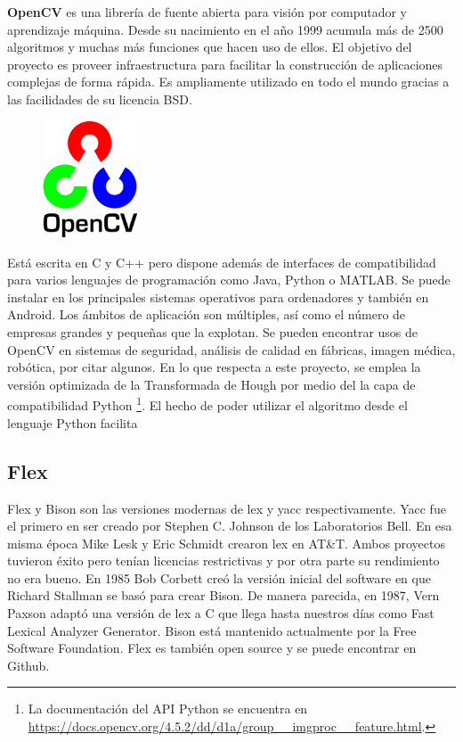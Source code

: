 \textbf{OpenCV} \cite{opencvTeam_oficialSite_main} es una librería de fuente abierta para visión por computador y aprendizaje máquina. Desde su nacimiento en el año 1999 acumula más de 2500 algoritmos y muchas más funciones que hacen uso de ellos. El objetivo del proyecto es proveer infraestructura para facilitar la construcción de aplicaciones complejas de forma rápida. Es ampliamente utilizado en todo el mundo gracias a las facilidades de su licencia BSD. 

\begin{figure}
    \centering
    \includegraphics[width=0.25\textwidth]{imaxes/e-fundamentos-tecnologicos/logo-opencv.png}
\end{figure}

Está escrita en C y C++ pero dispone además de interfaces de compatibilidad para varios lenguajes de programación como Java, Python o MATLAB. Se puede instalar en los principales sistemas operativos para ordenadores y también en Android. Los ámbitos de aplicación son múltiples, así como el número de empresas grandes y pequeñas que la explotan. Se pueden encontrar usos de OpenCV en sistemas de seguridad, análisis de calidad en fábricas, imagen médica, robótica, por citar algunos. En lo que respecta a este proyecto, se emplea la versión optimizada de la Transformada de Hough por medio del la capa de compatibilidad Python \footnote{La documentación del API Python se encuentra en \url{https://docs.opencv.org/4.5.2/dd/d1a/group__imgproc__feature.html}.}. El hecho de poder utilizar el algoritmo desde el lenguaje Python facilita 

\subsection{Flex}
\label{subsec:flex}

Flex y Bison son las versiones modernas de lex y yacc respectivamente. Yacc fue el primero en ser creado por Stephen C. Johnson de los Laboratorios Bell. En esa misma época Mike Lesk y Eric Schmidt crearon lex en AT\&T. Ambos proyectos tuvieron éxito pero tenían licencias restrictivas y por otra parte su rendimiento no era bueno.
En 1985 Bob Corbett creó la versión inicial del software en que Richard Stallman se basó para crear Bison. De manera parecida, en 1987, Vern Paxson adaptó una versión de lex a C que llega hasta nuestros días como Fast Lexical Analyzer Generator. Bison está mantenido actualmente por la Free Software Foundation. Flex es también open source y se puede encontrar en Github.

